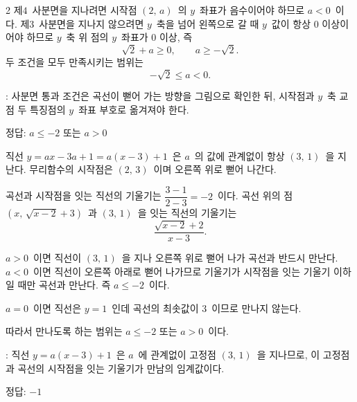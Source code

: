 \documentclass[10pt,fleqn]{article}
\begin{document}
\begin{multicols*}{2}
제$4$\ 사분면을 지나려면 시작점 $(2,\, a)$\ 의 $y$\ 좌표가 음수이어야 하므로 $a<0$\ 이다. 제$3$\ 사분면을 지나지 않으려면 $y$\ 축을 넘어 왼쪽으로 갈 때 $y$\ 값이 항상 $0$ 이상이어야 하므로 $y$\ 축 위 점의 $y$\ 좌표가 $0$ 이상, 즉
\[ \sqrt{2}+a \ge 0,\qquad a \ge -\sqrt{2}. \]
두 조건을 모두 만족시키는 범위는
\[ -\sqrt{2}\le a<0. \]

\begin{dmcriticalpoint}
: 사분면 통과 조건은 곡선이 뻗어 가는 방향을 그림으로 확인한 뒤, 시작점과 $y$\ 축 교점 두 특징점의 $y$\ 좌표 부호로 옮겨져야 한다.
\end{dmcriticalpoint}

\begin{dmanswerbox}
정답: $a \le -2$ 또는 $a>0$
\end{dmanswerbox}

직선 $y=ax-3a+1=a(x-3)+1$\ 은 $a$\ 의 값에 관계없이 항상 $(3,\, 1)$\ 을 지난다. 무리함수의 시작점은 $(2,\, 3)$\ 이며 오른쪽 위로 뻗어 나간다.

곡선과 시작점을 잇는 직선의 기울기는 $\dfrac{3-1}{2-3}=-2$\ 이다. 곡선 위의 점 $(x,\, \sqrt{x-2}+3)$\ 과 $(3,\, 1)$\ 을 잇는 직선의 기울기는
\[ \dfrac{\sqrt{x-2}+2}{x-3}. \]

$a>0$\ 이면 직선이 $(3,\, 1)$\ 을 지나 오른쪽 위로 뻗어 나가 곡선과 반드시 만난다. $a<0$\ 이면 직선이 오른쪽 아래로 뻗어 나가므로 기울기가 시작점을 잇는 기울기 이하일 때만 곡선과 만난다. 즉 $a\le -2$\ 이다.

$a=0$\ 이면 직선은 $y=1$\ 인데 곡선의 최솟값이 $3$\ 이므로 만나지 않는다.

따라서 만나도록 하는 범위는 $a \le -2$ 또는 $a>0$\ 이다.

\begin{dmcriticalpoint}
: 직선 $y=a(x-3)+1$\ 은 $a$\ 에 관계없이 고정점 $(3,\, 1)$\ 을 지나므로, 이 고정점과 곡선의 시작점을 잇는 기울기가 만남의 임계값이다.
\end{dmcriticalpoint}

\begin{dmanswerbox}
정답: $-1$
\end{dmanswerbox}


\end{multicols*}
\end{document}
